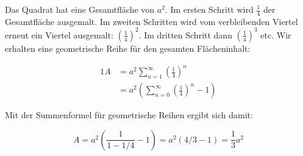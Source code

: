 \item Das Quadrat hat eine Gesamtfläche von $a^2$. Im ersten Schritt wird $\frac{1}{4}$ der Gesamtfläche ausgemalt. Im zweiten Schritten wird vom verbleibenden Viertel erneut ein Viertel ausgemalt: $\left(\frac{1}{4}\right)^2$. Im dritten Schritt dann $\left(\frac{1}{4}\right)^3$ etc. Wir erhalten eine geometrische Reihe für den gesamten Flächeninhalt:

\begin{alignat*}{1}
	A &= a^2 \sum\limits_{n=1}^\infty \left(\frac{1}{4}\right)^n \\
	  &= a^2 \left(\sum\limits_{n=0}^\infty \left(\frac{1}{4}\right)^n - 1\right)
\end{alignat*}

Mit der Summenformel für geometrische Reihen ergibt sich damit:

$$
	A = a^2 \left(\frac{1}{1-1/4} - 1\right) = a^2 (4/3-1) = \frac{1}{3}a^2
$$
